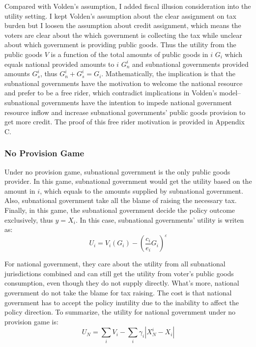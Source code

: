 \begin{itemize}
Compared with Volden's assumption, I added fiscal illusion consideration into the utility setting. I kept Volden's assumption about the clear assignment on tax burden but I loosen the assumption about credit assignment, which means the voters are clear about the which government is collecting the tax while unclear about which government is providing public goods. Thus the utility from the public goods $V$ is a function of the total amounts of public goods in $i$ $G_i$ which equals national provided amounts to $i$ $G_n^i$ and subnational governments provided amounts $G_s^i$, thus $G_n^i+G_s^i=G_i$. Mathematically, the implication is that the subnational governments have the motivation to welcome the national resource and prefer to be a free rider, which contradict implications in Volden's model--subnational governments have the intention to impede national government resource inflow and increase subnational governments' public goods provision to get more credit. The proof of this free rider motivation is provided in Appendix C.

\subsubsection{No Provision Game}
Under no provision game, subnational government is the only public goods provider. In this game, subnational government would get the utility based on the amount in $i$, which equals to the amounts supplied by subnational government. Also, subnational government take all the blame of raising the necessary tax. Finally, in this game, the subnational government decide the policy outcome exclusively, thus $y=X_i$. In this case, subnational governments' utility is writen as:
$$U_i=V_i\left(G_i\right)-\left(\frac{c_i}{e_i} G_i\right)^{\varepsilon}$$

For national government, they care about the utility from all subnational jurisdictions combined and can still get the utility from voter's public goods consumption, even though they do not supply directly. What's more, national government do not take the blame for tax raising. The cost is that national government has to accept the policy inutility due to the inability to affect the policy direction. To summarize, the utility for national government under no provision game is:
$$U_N=\sum_i V_i-\sum_i \gamma_i\left|X_N^i-X_i\right|$$


\end{itemize}
